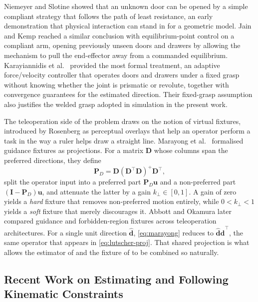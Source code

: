 \documentclass[11pt,letterpaper]{article}
\newcommand{\vect}[1]{\bm{#1}}
\newcommand{\I}{\mathbf{I}}
\newcommand{\vuser}{\vect{u}}
\begin{document}
Niemeyer and Slotine \cite{niemeyer1997simple} showed that an unknown door can be opened by a simple compliant strategy that follows the path of least resistance, an early demonstration that physical interaction can stand in for a geometric model. Jain and Kemp \cite{jain2009pulling,jain2010pulling} reached a similar conclusion with equilibrium-point control on a compliant arm, opening previously unseen doors and drawers by allowing the mechanism to pull the end-effector away from a commanded equilibrium. Karayiannidis et al.\ \cite{karayiannidis2013modelfree,karayiannidis2016adaptive} provided the most formal treatment, an adaptive force/velocity controller that operates doors and drawers under a fixed grasp without knowing whether the joint is prismatic or revolute, together with convergence guarantees for the estimated direction. Their fixed-grasp assumption also justifies the welded grasp adopted in simulation in the present work.

The teleoperation side of the problem draws on the notion of virtual fixtures, introduced by Rosenberg \cite{rosenberg1993virtual} as perceptual overlays that help an operator perform a task in the way a ruler helps draw a straight line. Marayong et al.\ \cite{marayong2003spatial} formalised guidance fixtures as projections. For a matrix $\mathbf{D}$ whose columns span the preferred directions, they define
\begin{equation}
  \mathbf{P}_{D} = \mathbf{D}\left(\mathbf{D}^{\top}\mathbf{D}\right)^{+}\mathbf{D}^{\top},
  \label{eq:marayong}
\end{equation}
split the operator input into a preferred part $\mathbf{P}_D\vuser$ and a non-preferred part $(\I-\mathbf{P}_D)\vuser$, and attenuate the latter by a gain $k_{\perp}\in[0,1]$. A gain of zero yields a \emph{hard} fixture that removes non-preferred motion entirely, while $0<k_{\perp}<1$ yields a \emph{soft} fixture that merely discourages it. Abbott and Okamura \cite{abbott2003architectures} later compared guidance and forbidden-region fixtures across teleoperation architectures. For a single unit direction $\hat{\vect{d}}$, \eqref{eq:marayong} reduces to $\hat{\vect{d}}\hat{\vect{d}}^{\top}$, the same operator that appears in \eqref{eq:lutscher-proj}. That shared projection is what allows the estimator of \cite{lutscher2010control} and the fixture of \cite{marayong2003spatial} to be combined so naturally.

\subsection{Recent Work on Estimating and Following Kinematic Constraints}
\label{sec:recent-estimation}
\end{document}
